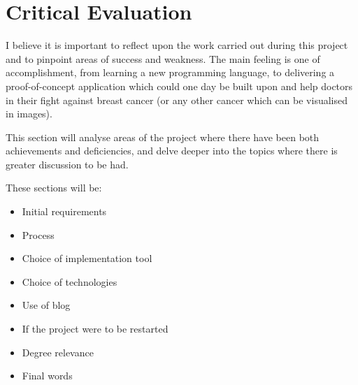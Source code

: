 \chapter{Critical Evaluation}






I believe it is important to reflect upon the work carried out during this project and to pinpoint areas of success and weakness. The main feeling is one of accomplishment, from learning a new programming language, to delivering a proof-of-concept application which could one day be built upon and help doctors in their fight against breast cancer (or any other cancer which can be visualised in images).

This section will analyse areas of the project where there have been both achievements and deficiencies, and delve deeper into the topics where there is greater discussion to be had.

These sections will be:
\begin{itemize}
  \item Initial requirements
  \item Process
  \item Choice of implementation tool
  \item Choice of technologies
  \item Use of blog
  \item If the project were to be restarted
  \item Degree relevance
  \item Final words
\end{itemize}

